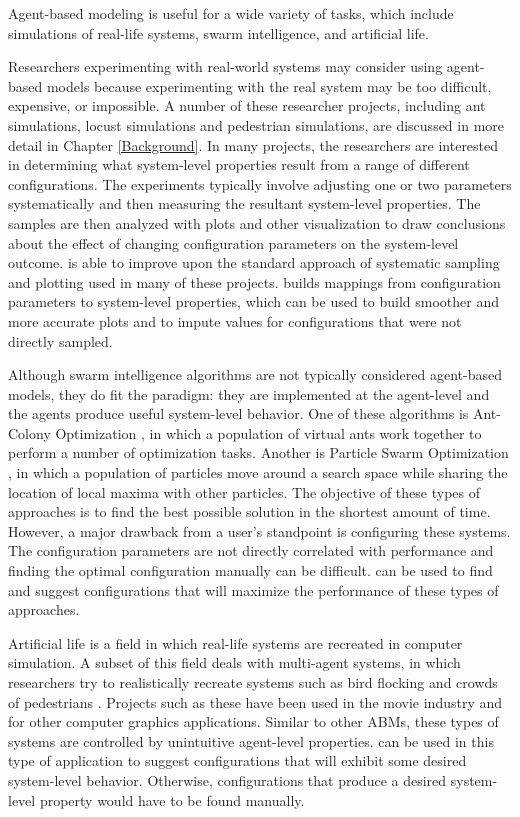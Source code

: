 Agent-based modeling is useful for a wide variety of tasks, which include simulations of real-life systems, swarm intelligence, and artificial life.

Researchers experimenting with real-world systems may consider using agent-based models because experimenting with the real system may be too difficult, expensive, or impossible.
A number of these researcher projects, including ant simulations, locust simulations and pedestrian simulations, are discussed in more detail in Chapter \ref{Background}.
In many projects, the researchers are interested in determining what system-level properties result from a range of different configurations.
The experiments typically involve adjusting one or two parameters systematically and then measuring the resultant system-level properties.
The samples are then analyzed with plots and other visualization to draw conclusions about the effect of changing configuration parameters on the system-level outcome.
\fw is able to improve upon the standard approach of systematic sampling and plotting used in many of these projects.
\fw builds mappings from configuration parameters to system-level properties, which can be used to build smoother and more accurate plots and to impute values for configurations that were not directly sampled.

Although swarm intelligence algorithms are not typically considered agent-based models, they do fit the paradigm: they are implemented at the agent-level and the agents produce useful system-level behavior.
One of these algorithms is Ant-Colony Optimization \cite{dorigo2004aco}, in which a population of virtual ants work together to perform a number of optimization tasks.
Another is Particle Swarm Optimization \cite{kennedy1995pso}, in which a population of particles move around a search space while sharing the location of local maxima with other particles.
The objective of these types of approaches is to find the best possible solution in the shortest amount of time.
However, a major drawback from a user's standpoint is configuring these systems.
The configuration parameters are not directly correlated with performance and finding the optimal configuration manually can be difficult.
\fw can be used to find and suggest configurations that will maximize the performance of these types of approaches.

Artificial life is a field in which real-life systems are recreated in computer simulation.
A subset of this field deals with multi-agent systems, in which researchers try to realistically recreate systems such as bird flocking \cite{reynolds1987} and crowds of pedestrians \cite{shao2007autonomous}\cite{pelechano2007controlling}.
Projects such as these have been used in the movie industry \cite{maes1995artificial} and for other computer graphics applications.
Similar to other ABMs, these types of systems are controlled by unintuitive agent-level properties.
\fw can be used in this type of application to suggest configurations that will exhibit some desired system-level behavior.
Otherwise, configurations that produce a desired system-level property would have to be found manually.

